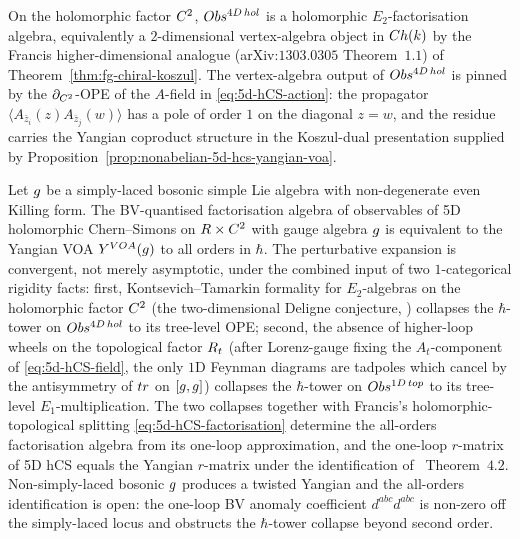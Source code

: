 On the holomorphic factor $C^2$, $Obs^{4D\,hol}$ is a
holomorphic $E_2$-factorisation algebra, equivalently a
$2$-dimensional vertex-algebra object in $Ch(k)$ by the Francis
higher-dimensional analogue (arXiv:$1303.0305$ Theorem~$1.1$) of
Theorem~\ref{thm:fg-chiral-koszul}. The vertex-algebra output of
$Obs^{4D\,hol}$ is pinned by the $\partial_{C^2}$-OPE
of the $A$-field in \eqref{eq:5d-hCS-action}: the propagator
$\langle A_{\bar z_i}(z) A_{\bar z_j}(w)\rangle$ has a pole of order
$1$ on the diagonal $z = w$, and the residue carries the Yangian
coproduct structure in the Koszul-dual presentation supplied by
Proposition~\ref{prop:nonabelian-5d-hcs-yangian-voa}.

\begin{proposition}
\label{prop:nonabelian-5d-hcs-yangian-voa}
Let $g$ be a simply-laced bosonic simple Lie algebra with
non-degenerate even Killing form. The BV-quantised factorisation algebra
of observables of 5D holomorphic Chern--Simons on $R \times C^2$ with
gauge algebra $g$ is equivalent to the Yangian VOA
$Y^{VOA}(g)$ to all orders in $\hbar$. The perturbative
expansion is convergent, not merely asymptotic, under the combined
input of two $1$-categorical rigidity facts: first, Kontsevich--Tamarkin
formality for $E_2$-algebras on the holomorphic factor $C^2$ (the
two-dimensional Deligne conjecture, \cite{Kontsevich1999,Tamarkin2007})
collapses the $\hbar$-tower on $Obs^{4D\,hol}$ to its
tree-level OPE; second, the absence of higher-loop wheels on the
topological factor $R_t$ (after Lorenz-gauge fixing the $A_t$-component
of \eqref{eq:5d-hCS-field}, the only $1$D Feynman diagrams are tadpoles
which cancel by the antisymmetry of $tr$ on $[g, g]$) collapses
the $\hbar$-tower on $Obs^{1D\,top}$ to its tree-level
$E_1$-multiplication. The two collapses together with Francis's
holomorphic-topological splitting \eqref{eq:5d-hCS-factorisation}
determine the all-orders factorisation algebra from its one-loop
approximation, and the one-loop $r$-matrix of 5D hCS equals the
Yangian $r$-matrix under the identification of
\cite{CostelloWittenYamazaki}~Theorem~$4.2$. Non-simply-laced bosonic
$g$ produces a twisted Yangian and the all-orders identification is
open: the one-loop BV anomaly coefficient $d^{abc} d^{abc}$ is
non-zero off the simply-laced locus and obstructs the $\hbar$-tower
collapse beyond second order.
\end{proposition}

